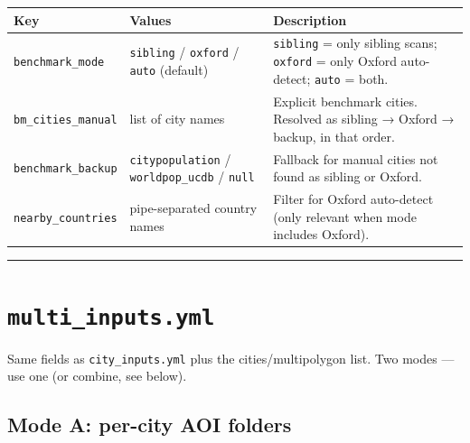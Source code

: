 \documentclass[
  letterpaper,
  DIV=11,
  numbers=noendperiod]{scrreprt}
\newcounter{none} %
\begin{document}
{\def\LTcaptype{none} %
\begin{longtable}[]{@{}
  >{\raggedright\arraybackslash}p{}
  >{\raggedright\arraybackslash}p{}
  >{\raggedright\arraybackslash}p{}@{}}
\toprule\noalign{}
\begin{minipage}[b]{\linewidth}\raggedright
Key
\end{minipage} & \begin{minipage}[b]{\linewidth}\raggedright
Values
\end{minipage} & \begin{minipage}[b]{\linewidth}\raggedright
Description
\end{minipage} \\
\midrule\noalign{}
\endhead
\bottomrule\noalign{}
\endlastfoot
\texttt{benchmark\_mode} & \texttt{sibling} / \texttt{oxford} /
\texttt{auto} (default) & \texttt{sibling} = only sibling scans;
\texttt{oxford} = only Oxford auto-detect; \texttt{auto} = both. \\
\texttt{bm\_cities\_manual} & list of city names & Explicit benchmark
cities. Resolved as sibling → Oxford → backup, in that order. \\
\texttt{benchmark\_backup} & \texttt{citypopulation} /
\texttt{worldpop\_ucdb} / \texttt{null} & Fallback for manual cities not
found as sibling or Oxford. \\
\texttt{nearby\_countries} & pipe-separated country names & Filter for
Oxford auto-detect (only relevant when mode includes Oxford). \\
\end{longtable}
}

\begin{center}\rule{0.5\linewidth}{0.5pt}\end{center}

\section{\texorpdfstring{\texttt{multi\_inputs.yml}}{multi\_inputs.yml}}\label{multi_inputs.yml}

Same fields as \texttt{city\_inputs.yml} plus the cities/multipolygon
list. Two modes --- use one (or combine, see below).

\subsection{Mode A: per-city AOI
folders}\label{mode-a-per-city-aoi-folders}
\end{document}
